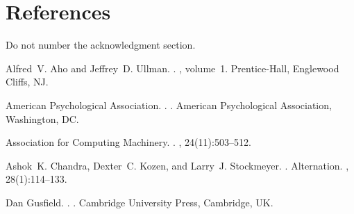 \documentclass[11pt,letterpaper]{article}
\begin{document}

\section*{References}

Do not number the acknowledgment section.

\begin{thebibliography}{}

Alfred~V. Aho and Jeffrey~D. Ullman.
.
, volume~1.
\newblock Prentice-{Hall}, Englewood Cliffs, NJ.

{American Psychological Association}.
.
.
\newblock American Psychological Association, Washington, DC.

{Association for Computing Machinery}.
.
, 24(11):503--512.

Ashok~K. Chandra, Dexter~C. Kozen, and Larry~J. Stockmeyer.
.
\newblock Alternation.
,
  28(1):114--133.

Dan Gusfield.
.
.
\newblock Cambridge University Press, Cambridge, UK.

\end{thebibliography}
\end{document}
